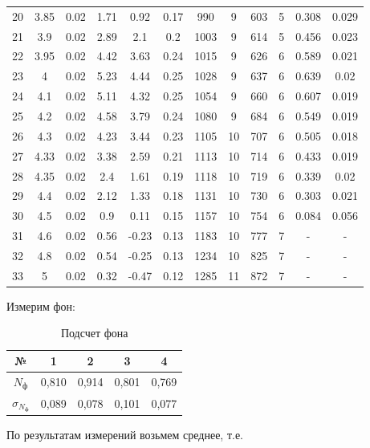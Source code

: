 \documentclass[12pt]{kiarticle} %
\begin{document}
\begin{table}[h!]
\begin{center}
\begin{tabular}{|c|c|c|c|c|c|c|c|c|c|c|c|}
	20 & 3.85 & 0.02 & 1.71 & 0.92 & 0.17 & 990 & 9 & 603 & 5 & 0.308 & 0.029 \\
	21 & 3.9 & 0.02 & 2.89 & 2.1 & 0.2 & 1003 & 9 & 614 & 5 & 0.456 & 0.023 \\
	22 & 3.95 & 0.02 & 4.42 & 3.63 & 0.24 & 1015 & 9 & 626 & 6 & 0.589 & 0.021 \\
	23 & 4 & 0.02 & 5.23 & 4.44 & 0.25 & 1028 & 9 & 637 & 6 & 0.639 & 0.02 \\
	24 & 4.1 & 0.02 & 5.11 & 4.32 & 0.25 & 1054 & 9 & 660 & 6 & 0.607 & 0.019 \\
	25 & 4.2 & 0.02 & 4.58 & 3.79 & 0.24 & 1080 & 9 & 684 & 6 & 0.549 & 0.019 \\
	26 & 4.3 & 0.02 & 4.23 & 3.44 & 0.23 & 1105 & 10 & 707 & 6 & 0.505 & 0.018 \\
	27 & 4.33 & 0.02 & 3.38 & 2.59 & 0.21 & 1113 & 10 & 714 & 6 & 0.433 & 0.019 \\
	28 & 4.35 & 0.02 & 2.4 & 1.61 & 0.19 & 1118 & 10 & 719 & 6 & 0.339 & 0.02 \\
	29 & 4.4 & 0.02 & 2.12 & 1.33 & 0.18 & 1131 & 10 & 730 & 6 & 0.303 & 0.021 \\
	30 & 4.5 & 0.02 & 0.9 & 0.11 & 0.15 & 1157 & 10 & 754 & 6 & 0.084 & 0.056 \\
	31 & 4.6 & 0.02 & 0.56 & -0.23 & 0.13 & 1183 & 10 & 777 & 7 & - & - \\
	32 & 4.8 & 0.02 & 0.54 & -0.25 & 0.13 & 1234 & 10 & 825 & 7 &- & - \\
	33 & 5 & 0.02 & 0.32 & -0.47 & 0.12 & 1285 & 11 & 872 & 7 & - & - \\
				\hline
			\end{tabular}
		\end{center}
		\label{table_1}
	\end{table}

	Измерим фон:
	\begin{table}[H]
		\caption{Подсчет фона}
	\begin{center}
		\begin{tabular}{|c|c|c|c|c|}
		\hline 
		№ & 1 & 2 & 3 & 4 \\ 
		\hline 
		$ N_ф $ & 0,810 & 0,914 & 0,801 & 0,769 \\ 
		\hline 
		$ \sigma_{N_ф }$ & 0,089 & 0,078 & 0,101 & 0,077 \\ 
		\hline 
	\end{tabular}
	\end{center} 
	\end{table}
	По результатам измерений возьмем среднее, т.е. 
\end{document}
